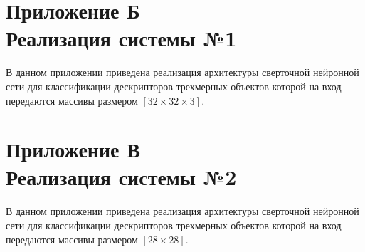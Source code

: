 \documentclass[14pt]{article}
\numberwithin{figure}{section}
\numberwithin{equation}{section}
\begin{document}
\newpage
{}
\section*{Приложение Б\\Реализация системы №1}

В данном приложении приведена реализация архитектуры сверточной нейронной сети для классификации дескрипторов трехмерных объектов которой на вход передаются массивы размером $[32 \times 32 \times 3]$.

 

\newpage
{}
\section*{Приложение В\\Реализация системы №2}

В данном приложении приведена реализация архитектуры сверточной нейронной сети для классификации дескрипторов трехмерных объектов которой на вход передаются массивы размером $[28 \times 28]$.



\end{document}
